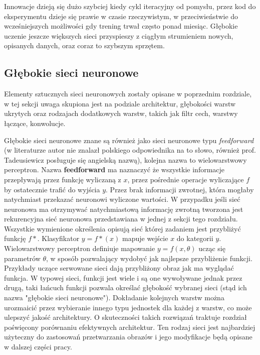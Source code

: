 \documentclass[12pt,a4paper,twoside,titlepage,openright]{book}
\begin{document}
Innowacje dzieją się dużo szybciej kiedy cykl iteracyjny od pomysłu, przez kod do eksperymentu dzieje się prawie w czasie rzeczywistym, w przeciwieństwie do wcześniejszych możliwości gdy trening trwał często ponad miesiąc. Głębokie uczenie jeszcze większych sieci przyspieszy z ciągłym strumieniem nowych, opisanych danych, oraz coraz to szybszym sprzętem.

\subsection{Głębokie sieci neuronowe}
Elementy sztucznych sieci neuronowych zostały opisane w poprzednim rozdziale, w tej sekcji uwaga skupiona jest na podziale architektur, głębokości warstw ukrytych oraz rodzajach dodatkowych warstw, takich jak filtr cech, warstwy łączące, konwolucje.

Głębokie sieci neuronowe znane są również jako sieci neuronowe typu \textit{feedforward} (w literaturze autor nie znalazł polskiego odpowiednika na to słowo, również prof. Tadeusiewicz posługuje się angielską nazwą), kolejna nazwa to wielowarstwowy perceptron. Nazwa \textbf{feedforward} ma naznaczyć że wszystkie informacje przepływają przez funkcję wyliczaną z \(x\), przez pośrednie operacje wyliczające \(f\) by ostatecznie trafić do wyjścia \(y\). Przez brak informacji zwrotnej, która mogłaby natychmiast przekazać neuronowi wyliczone wartości. W przypadku jeśli sieć neuronowa ma otrzymywać natychmiastową informację zwrotną tworzona jest rekurencyjna sieć neuronowa przedstawiana w jednej z sekcji tego rozdziału. Wszystkie wymienione określenia opisują sieć której zadaniem jest przybliżyć funkcję \(f*\). Klasyfikator \(y = f*(x) \) mapuje wejście \(x\) do kategorii \(y\). Wielowarstwowy perceptron definiuje mapowanie \(y = f(x,\theta)\) ucząc się parametrów \(\theta\), w sposób pozwalający wydobyć jak najlepsze przybliżenie funkcji. Przykłady uczące serwowane sieci dają przybliżony obraz jak ma wyglądać funkcja. W typowej sieci, funkcji jest wiele i są one wywoływane jednak przez drugą, taki łańcuch funkcji pozwala określać głębokość wybranej sieci (stąd ich nazwa "głębokie sieci neuronowe"). Dokładanie kolejnych warstw można urozmaicić przez wybieranie innego typu jednostek dla każdej z warstw, co może ulepszyć jakość architektury. O skuteczności takich rozwiązań traktuje rozdział poświęcony porównaniu efektywnych architektur. Ten rodzaj sieci jest najbardziej użyteczny do zastosowań przetwarzania obrazów i jego modyfikacje będą opisane w dalszej części pracy.
\end{document}
